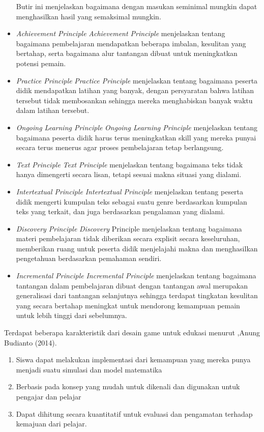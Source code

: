 \begin{itemize}
			\subitem Butir ini menjelaskan bagaimana dengan masukan seminimal mungkin dapat menghasilkan hasil yang semaksimal mungkin.
		\item \textit{Achievement Principle}
			\subitem \textit{Achievement Principle} menjelaskan tentang bagaimana pembelajaran mendapatkan beberapa imbalan, kesulitan yang bertahap, serta bagaimana alur tantangan  dibuat untuk meningkatkan potensi pemain.
		\item \textit{Practice Principle}
			\subitem \textit{Practice Principle} menjelaskan tentang bagaimana peserta didik mendapatkan latihan yang banyak, dengan persyaratan bahwa latihan tersebut tidak membosankan sehingga mereka menghabiskan banyak waktu dalam latihan tersebut.
		\item \textit{Ongoing Learning Principle}
			\subitem \textit{Ongoing Learning Principle} menjelaskan tentang bagaimana peserta didik harus terus meningkatkan skill yang mereka punyai secara terus menerus agar proses pembelajaran tetap berlangsung.
		\item \textit{Text Principle}
			\subitem \textit{Text Principle} menjelaskan tentang bagaimana teks tidak hanya dimengerti secara lisan, tetapi sesuai makna situasi yang dialami.
		\item \textit{Intertextual Principle}
			\subitem \textit{Intertextual Principle} menjelaskan tentang peserta didik mengerti kumpulan teks sebagai suatu genre berdasarkan kumpulan teks yang terkait, dan juga berdasarkan pengalaman yang dialami.
		\item \textit{Discovery Principle}
			\subitem \textit{Discovery} Principle menjelaskan tentang bagaimana materi pembelajaran tidak diberikan secara explisit secara keseluruhan, memberikan ruang untuk peserta didik menjelajahi makna dan menghasilkan pengetahuan berdasarkan pemahaman sendiri.
		\item \textit{Incremental Principle}
			\subitem \textit{Incremental Principle} menjelaskan tentang bagaimana tantangan dalam pembelajaran dibuat dengan tantangan awal merupakan generalisasi dari tantangan selanjutnya sehingga terdapat tingkatan kesulitan yang secara bertahap meningkat untuk mendorong kemampuan pemain untuk lebih tinggi dari sebelumnya.
		
	\end{itemize}
	
	Terdapat beberapa karakteristik dari desain game untuk edukasi menurut ,Anung Budianto (2014).
	\begin{enumerate}
		\item Siswa dapat melakukan implementasi dari kemampuan yang mereka punya menjadi suatu simulasi dan model matematika
		\item Berbasis pada konsep yang mudah untuk dikenali dan digunakan untuk pengajar dan pelajar
		\item Dapat dihitung secara kuantitatif untuk evaluasi dan pengamatan terhadap kemajuan dari pelajar.
	\end{enumerate}
	
